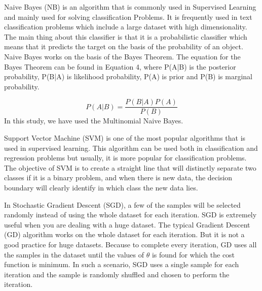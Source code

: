 \documentclass[conference]{IEEEtran}
\begin{document}
\par

\vspace{0.3cm}
Naive Bayes (NB) is an algorithm that is commonly used in Supervised Learning and mainly used for solving classification Problems. It is frequently used in text classification problems which include a large dataset with high dimensionality. The main thing about this classifier is that it is a probabilistic classifier which means that it predicts the target on the basis of the probability of an object. Naive Bayes works on the basis of the Bayes Theorem. The equation for the Bayes Theorem can be found in Equation 4, where P(A|B) is the posterior probability, P(B|A) is likelihood probability, P(A) is prior and P(B) is marginal probability. 

\begin{equation}
   P(A|B)=\frac{P(B|A) P(A)}{P(B)}
\end{equation}
 In this study, we have used the Multinomial Naive Bayes.

\vspace{0.3cm}

\par 
Support Vector Machine (SVM) is one of the most popular algorithms that is used in supervised learning. This algorithm can be used both in classification and regression problems but usually, it is more popular for classification problems. The objective of SVM is to create a straight line that will distinctly separate two classes if it is a binary problem, and when there is new data, the decision boundary will clearly identify in which class the new data lies. 
\par
\vspace{0.3cm}

In Stochastic Gradient Descent (SGD), a few of the samples will be selected randomly instead of using the whole dataset for each iteration. SGD is extremely useful when you are dealing with a huge dataset. The typical Gradient Descent (GD) algorithm works on the whole dataset for each iteration. %
But it is not a good practice for huge datasets. Because to complete every iteration, GD uses all the samples in the dataset until the values of $\theta$ is found for which the cost function is minimum. In such a scenario, SGD uses a single sample for each iteration and the sample is randomly shuffled and chosen to perform the iteration. \\
\end{document}
